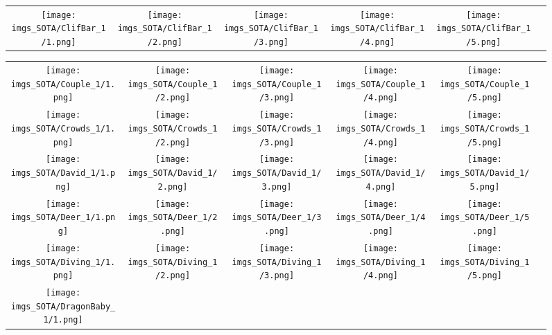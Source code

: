 \begin{figure}[H]
\begin{tabular}{@{}c@{}c@{}c@{}c@{}c@{}c@{}}
\\
\texttt{[image: imgs\_SOTA/ClifBar\_1/1.png]}&
\texttt{[image: imgs\_SOTA/ClifBar\_1/2.png]}&
\texttt{[image: imgs\_SOTA/ClifBar\_1/3.png]}&
\texttt{[image: imgs\_SOTA/ClifBar\_1/4.png]}&
\texttt{[image: imgs\_SOTA/ClifBar\_1/5.png]}&
\\
\end{tabular}\end{figure}\begin{figure}[H]
\setlength{\tabcolsep}{6pt}
\renewcommand{\arraystretch}{0}
\begin{tabular}{@{}c@{}c@{}c@{}c@{}c@{}c@{}}\texttt{[image: imgs\_SOTA/Couple\_1/1.png]}&
\texttt{[image: imgs\_SOTA/Couple\_1/2.png]}&
\texttt{[image: imgs\_SOTA/Couple\_1/3.png]}&
\texttt{[image: imgs\_SOTA/Couple\_1/4.png]}&
\texttt{[image: imgs\_SOTA/Couple\_1/5.png]}&
\\
\texttt{[image: imgs\_SOTA/Crowds\_1/1.png]}&
\texttt{[image: imgs\_SOTA/Crowds\_1/2.png]}&
\texttt{[image: imgs\_SOTA/Crowds\_1/3.png]}&
\texttt{[image: imgs\_SOTA/Crowds\_1/4.png]}&
\texttt{[image: imgs\_SOTA/Crowds\_1/5.png]}&
\\
\texttt{[image: imgs\_SOTA/David\_1/1.png]}&
\texttt{[image: imgs\_SOTA/David\_1/2.png]}&
\texttt{[image: imgs\_SOTA/David\_1/3.png]}&
\texttt{[image: imgs\_SOTA/David\_1/4.png]}&
\texttt{[image: imgs\_SOTA/David\_1/5.png]}&
\\
\texttt{[image: imgs\_SOTA/Deer\_1/1.png]}&
\texttt{[image: imgs\_SOTA/Deer\_1/2.png]}&
\texttt{[image: imgs\_SOTA/Deer\_1/3.png]}&
\texttt{[image: imgs\_SOTA/Deer\_1/4.png]}&
\texttt{[image: imgs\_SOTA/Deer\_1/5.png]}&
\\
\texttt{[image: imgs\_SOTA/Diving\_1/1.png]}&
\texttt{[image: imgs\_SOTA/Diving\_1/2.png]}&
\texttt{[image: imgs\_SOTA/Diving\_1/3.png]}&
\texttt{[image: imgs\_SOTA/Diving\_1/4.png]}&
\texttt{[image: imgs\_SOTA/Diving\_1/5.png]}&
\\
\texttt{[image: imgs\_SOTA/DragonBaby\_1/1.png]}&

\end{tabular}
\end{figure}

